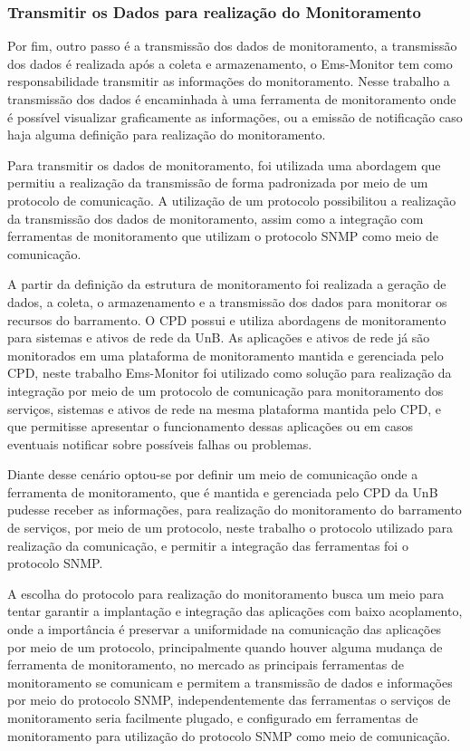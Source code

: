 \subsubsection{Transmitir os Dados para realização do Monitoramento}
Por fim, outro passo é a transmissão dos dados de monitoramento, a transmissão dos dados é realizada após a coleta e armazenamento, o Ems-Monitor tem como responsabilidade transmitir as informações do monitoramento. Nesse trabalho a transmissão dos dados é encaminhada à uma ferramenta de monitoramento onde é possível visualizar graficamente as informações, ou a emissão de notificação caso haja alguma definição para realização do monitoramento.

Para transmitir os dados de monitoramento, foi utilizada uma abordagem que permitiu a realização da transmissão de forma padronizada por meio de um protocolo de comunicação. A utilização de um protocolo possibilitou a realização da transmissão dos dados de monitoramento, assim como a integração com ferramentas de monitoramento que utilizam o protocolo \acrshort{SNMP} como meio de comunicação.  

\vspace{10mm}
\noindent
A partir da definição da estrutura de monitoramento foi realizada a geração de dados, a coleta, o armazenamento e a transmissão dos dados para monitorar os recursos do barramento. O \acrshort{CPD} possui e utiliza abordagens de monitoramento para sistemas e ativos de rede da \acrshort{UnB}. As aplicações e ativos de rede já são monitorados em uma plataforma de monitoramento mantida e gerenciada pelo \acrshort{CPD}, neste trabalho Ems-Monitor foi utilizado como solução para realização da integração por meio de um protocolo de comunicação para monitoramento dos serviços, sistemas e ativos de rede na mesma plataforma mantida pelo \acrshort{CPD}, e que permitisse apresentar o funcionamento dessas aplicações ou em casos eventuais notificar sobre possíveis falhas ou problemas. 

Diante desse cenário optou-se por definir um meio de comunicação onde a ferramenta de monitoramento, que é mantida e gerenciada pelo \acrshort{CPD} da \acrshort{UnB} pudesse receber as informações, para realização do monitoramento do barramento de serviços, por meio de um protocolo, neste trabalho o protocolo utilizado para realização da comunicação, e permitir a integração das ferramentas foi o protocolo \acrshort{SNMP}. 

A escolha do protocolo para realização do monitoramento busca um meio para tentar garantir a implantação e integração das aplicações com baixo acoplamento, onde a importância é preservar a uniformidade na comunicação das aplicações por meio de um protocolo, principalmente quando houver alguma mudança de ferramenta de monitoramento, no mercado as principais ferramentas de monitoramento se comunicam e permitem a transmissão de dados e informações por meio do protocolo \acrshort{SNMP}, independentemente das ferramentas o serviços de monitoramento seria facilmente plugado, e configurado em ferramentas de monitoramento para utilização do protocolo \acrshort{SNMP} como meio de comunicação.      

